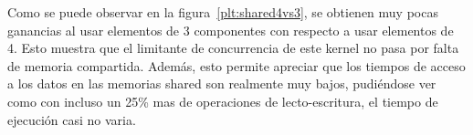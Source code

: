 Como se puede observar en la figura~\ref{plt:shared4vs3}, se obtienen muy pocas ganancias al usar elementos
de 3 componentes con respecto a usar elementos de 4. Esto muestra que el limitante de concurrencia
de este kernel no pasa por falta de memoria compartida. Adem\'as, esto permite apreciar que los
tiempos de acceso a los datos en las memorias shared son realmente muy bajos, pudi\'endose ver
como con incluso un 25\% mas de operaciones de lecto-escritura, el tiempo de ejecuci\'on casi no varia.


%
%
%
